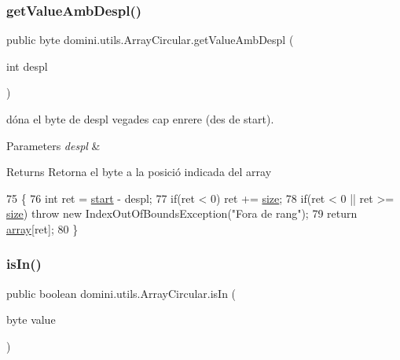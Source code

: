 \subsubsection{\texorpdfstring{get\+Value\+Amb\+Despl()}{getValueAmbDespl()}}
{\footnotesize\ttfamily public byte domini.\+utils.\+Array\+Circular.\+get\+Value\+Amb\+Despl (\begin{DoxyParamCaption}\item[{int}]{despl }\end{DoxyParamCaption})\hspace{0.3cm}{\ttfamily [inline]}}



dóna el byte de despl vegades cap enrere (des de start). 


\begin{DoxyParams}{Parameters}
{\em despl} & \\
\hline
\end{DoxyParams}
\begin{DoxyReturn}{Returns}
Retorna el byte a la posició indicada del array 
\end{DoxyReturn}

\begin{DoxyCode}
75     \{
76         \textcolor{keywordtype}{int} ret = \hyperlink{classdomini_1_1utils_1_1ArrayCircular_a5206ac4a02c25c16c8a8ed50f65ea87b}{start} - despl;
77         \textcolor{keywordflow}{if}(ret < 0) ret += \hyperlink{classdomini_1_1utils_1_1ArrayCircular_a1ffca5e28ff4dc515eddde9cd5926efd}{size};
78         \textcolor{keywordflow}{if}(ret < 0 || ret >= \hyperlink{classdomini_1_1utils_1_1ArrayCircular_a1ffca5e28ff4dc515eddde9cd5926efd}{size}) \textcolor{keywordflow}{throw} \textcolor{keyword}{new} IndexOutOfBoundsException(\textcolor{stringliteral}{"Fora de rang"});
79         \textcolor{keywordflow}{return} \hyperlink{classdomini_1_1utils_1_1ArrayCircular_a2af77a58adf605b58d79a1879a0a593f}{array}[ret];
80     \}
\end{DoxyCode}
\mbox{\label{classdomini_1_1utils_1_1ArrayCircular_aaf106d070b5937f2559a56257dc8cac3}} 
\subsubsection{\texorpdfstring{is\+In()}{isIn()}}
{\footnotesize\ttfamily public boolean domini.\+utils.\+Array\+Circular.\+is\+In (\begin{DoxyParamCaption}\item[{byte}]{value }\end{DoxyParamCaption})\hspace{0.3cm}{\ttfamily [inline]}}



